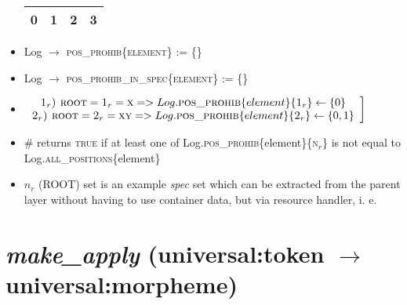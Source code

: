 \documentclass{article}
\begin{document}
\begin{itemize}
\begin{tabular}{ |c|c|c|c| }
         \textbf{0} & \textbf{1} & \textbf{2} & \textbf{3} \\ 
         \hline
        \end{tabular}
    \item Log $\rightarrow$ \textsc{pos\_prohib\{element\}} := \{\}
    \item Log $\rightarrow$ \textsc{pos\_prohib\_in\_spec\{element\}} := \{\}
    \item $\left.
          \begin{array}{ccc}
             \textsc{1$_{r}$) root} = \textsc{1$_{r}$} = \textsc{x} => Log.\textsc{pos\_prohib}\{element\}\{\textsc{1$_{r}$}\} \leftarrow \{0\}
             \\
             \textsc{2$_{r}$) root} = \textsc{2$_{r}$} = \textsc{xy} => Log.\textsc{pos\_prohib}\{element\}\{\textsc{2$_{r}$}\} \leftarrow \{0, 1\}
             \\
          \end{array}
        \right]$
    \item \# returns \textsc{true} if at least one of Log.\textsc{pos\_prohib}\{element\}\{\textsc{n$_{r}$}\} is not equal to Log.\textsc{all\_positions}\{element\}
    \item $n_r$ (\textsc{ROOT}) set is an example \textit{spec} set which can be extracted from the parent layer without having to use container data, but via resource handler, i. e.
\end{itemize}

\section{\textit{make\_apply} (universal:token $\rightarrow$ universal:morpheme)}
\end{document}
